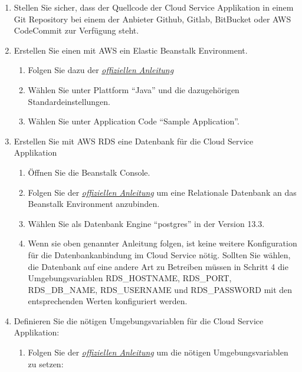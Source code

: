 \begin{enumerate}
    \item Stellen Sie sicher, dass der Quellcode der Cloud Service Applikation in einem Git Repository bei einem der Anbieter Github, Gitlab, BitBucket oder AWS CodeCommit zur Verfügung steht.
    \item Erstellen Sie einen mit AWS ein Elastic Beanstalk Environment.
    \begin{enumerate}
        \item Folgen Sie dazu der \href{https://docs.aws.amazon.com/elasticbeanstalk/latest/dg/GettingStarted.CreateApp.html}{\textit{offiziellen Anleitung}}\cite{aws-elastic}
        \item Wählen Sie unter Plattform ``Java'' und die dazugehörigen Standardeinstellungen.
        \item Wählen Sie unter Application Code ``Sample Application''.
    \end{enumerate}
    \item Erstellen Sie mit AWS RDS eine Datenbank für die Cloud Service Applikation
    \begin{enumerate}
        \item Öffnen Sie die Beanstalk Console.
        \item Folgen Sie der \href{https://docs.aws.amazon.com/elasticbeanstalk/latest/dg/using-features.managing.db.html}{\textit{offiziellen Anleitung}}\cite{aws-elastic-rds} um eine Relationale Datenbank an das Beanstalk Environment anzubinden.
        \item Wählen Sie als Datenbank Engine ``postgres'' in der Version 13.3.
        \item Wenn sie oben genannter Anleitung folgen, ist keine weitere Konfiguration für die Datenbankanbindung im Cloud Service nötig.
        Sollten Sie wählen, die Datenbank auf eine andere Art zu Betreiben müssen in Schritt 4 die Umgebungsvariablen RDS\_HOSTNAME, RDS\_PORT, RDS\_DB\_NAME, RDS\_USERNAME und RDS\_PASSWORD mit den entsprechenden Werten konfiguriert werden.
    \end{enumerate}
    \item Definieren Sie die nötigen Umgebungsvariablen für die Cloud Service Applikation:
    \begin{enumerate}
        \item Folgen Sie der \href{https://docs.aws.amazon.com/elasticbeanstalk/latest/dg/environments-cfg-softwaresettings.html}{\textit{offiziellen Anleitung}}\cite{aws-elastic-env} um die nötigen Umgebungsvariablen zu setzen:

\end{enumerate}
\end{enumerate}
